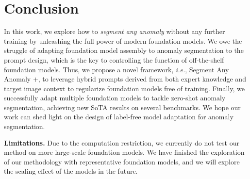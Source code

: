 \section{Conclusion}

In this work, we explore how to \textit{segment any anomaly} without any further training by unleashing the full power of modern foundation models. We owe the struggle of adapting foundation model assembly to anomaly segmentation to the prompt design, which is the key to controlling the function of off-the-shelf foundation models. Thus, we propose a novel framework, \textit{i.e.}, Segment Any Anomaly $+$, to leverage hybrid prompts derived from both expert knowledge and target image context to regularize foundation models free of training. Finally, we successfully adapt multiple foundation models to tackle zero-shot anomaly segmentation, achieving new SoTA results on several benchmarks. We hope our work can shed light on the design of label-free model adaptation for anomaly segmentation.

\textbf{Limitations.} Due to the computation restriction, we currently do not test our method on more large-scale foundation models. We have finished the exploration of our methodology with representative foundation models, and we will explore the scaling effect of the models in the future.


